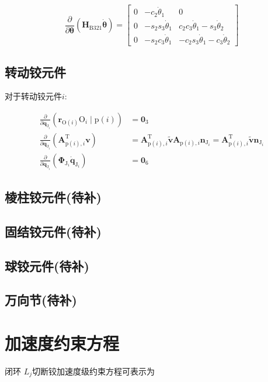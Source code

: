 \[
\frac{\partial}{\partial \boldsymbol{\theta}}\left(\boldsymbol{H}_{\mathrm{B} 321} \dot{\boldsymbol{\theta}}\right)=\left[\begin{array}{rrr}
0 & -c_{2} \dot{\theta}_{1} & 0 \\
0 & -s_{2} s_{3} \dot{\theta}_{1} & c_{2} c_{3} \dot{\theta}_{1}-s_{3} \dot{\theta}_{2} \\
0 & -s_{2} c_{3} \dot{\theta}_{1} & -c_{2} s_{3} \dot{\theta}_{1}-c_{3} \dot{\theta}_{2}
\end{array}\right]
\]
\subsection{转动铰元件}
对于转动铰元件$i$:

\[
\begin{aligned}
\frac{\partial}{\partial \boldsymbol{q}_{\mathrm{J}_{i}}}\left(\boldsymbol{r}_{\mathrm{O}(i)} \mathrm{O}_{i} \mid \mathrm{p}(i)\right) & =\mathbf{0}_{3} \\
\frac{\partial}{\partial \boldsymbol{q}_{\mathrm{J}_{i}}}\left(\boldsymbol{A}_{\mathrm{p}(i), i}^{\mathrm{T}} \boldsymbol{v}\right) & =\boldsymbol{A}_{\mathrm{p}(i), i}^{\mathrm{T}} \tilde{\boldsymbol{v}} \boldsymbol{A}_{\mathrm{p}(i), i} \boldsymbol{n}_{\mathrm{J}_{i}}=\boldsymbol{A}_{\mathrm{p}(i), i}^{\mathrm{T}} \tilde{\boldsymbol{v}} \boldsymbol{n}_{\mathrm{J}_{i}} \\
\frac{\partial}{\partial \boldsymbol{q}_{\mathrm{J}_{i}}}\left(\boldsymbol{\Phi}_{\mathrm{J}_{i}} \dot{\boldsymbol{q}}_{\mathrm{J}_{i}}\right) & =\mathbf{0}_{6}
\end{aligned}
\]
\subsection{棱柱铰元件(待补)}
\subsection{固结铰元件(待补)}
\subsection{球铰元件(待补)}
\subsection{万向节(待补)}
\section{加速度约束方程}
闭环 $L_{j}$切断铰加速度级约束方程可表示为

